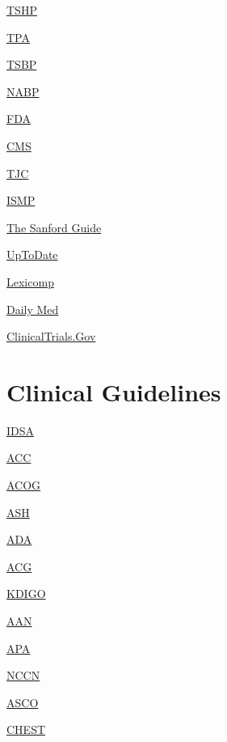 \documentclass[
]{book}
\begin{document}
\href{https://tshp.org/}{TSHP}

\href{https://www.texaspharmacy.org/}{TPA}

\href{https://www.pharmacy.texas.gov/}{TSBP}

\href{https://nabp.pharmacy/}{NABP}

\href{https://www.fda.gov/}{FDA}

\href{https://www.cms.gov/}{CMS}

\href{https://www.jointcommission.org/}{TJC}

\href{https://www.ismp.org/}{ISMP}

\href{https://www.sanfordguide.com/}{The Sanford Guide}

\href{https://www.uptodate.com/login}{UpToDate}

\href{https://online.lexi.com/lco/action/home}{Lexicomp}

\href{https://dailymed.nlm.nih.gov/dailymed/index.cfm}{Daily Med}

\href{https://beta.clinicaltrials.gov/}{ClinicalTrials.Gov}

\section{Clinical Guidelines}\label{clinical-guidelines}

\href{https://www.idsociety.org/practice-guideline/alphabetical-guidelines/}{IDSA}

\href{https://www.acc.org/guidelines}{ACC}

\href{https://www.acog.org/clinical/clinical-guidance/practice-bulletin}{ACOG}

\href{https://www.hematology.org/education/clinicians/guidelines-and-quality-care/clinical-practice-guidelines}{ASH}

\href{https://diabetesjournals.org/care/issue/45/Supplement_1}{ADA}

\href{https://gi.org/guidelines/}{ACG}

\href{https://kdigo.org/guidelines/}{KDIGO}

\href{https://www.aan.com/practice/guidelines}{AAN}

\href{https://www.psychiatry.org/psychiatrists/practice/clinical-practice-guidelines}{APA}

\href{https://www.nccn.org/guidelines/category_1}{NCCN}

\href{https://www.asco.org/practice-patients/guidelines}{ASCO}

\href{https://journal.chestnet.org/guidelines}{CHEST}
\end{document}

